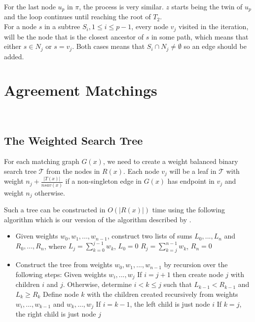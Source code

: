 For the last node $u_p$ in $\pi$, the process is very similar. $z$ starts being the twin of $u_p$ and the loop continues until reaching the root of $T_2$.\\

For a node $s$ in a subtree $S_i, 1 \le i \le p-1$, every node $v_j$ visited in the iteration, will be the node that is the closest ancestor of $s$ in some path, which means that either $s \in N_j$ or $s=v_j$. Both cases means that $S_i \cap N_j \ne \emptyset$ so an edge should be added.

\section{Agreement Matchings}
\\

\subsection{The Weighted Search Tree}
For each matching graph $G(x)$, we need to create a weight balanced binary search tree $\mathcal{T}$ from the nodes in $R(x)$. Each node $v_j$ will be a leaf in $\mathcal{T}$ with weight $n_j + \frac{|T(x)|}{nsav(x)}$ if a non-singleton edge in $G(x)$ has endpoint in $v_j$ and weight $n_j$ otherwise.

Such a tree can be constructed in $O(|R(x)|)$ time using the following algorithm which is our version of the algorithm described by .

\begin{itemize}
	\item Given weights ${w_0, w_1, ..., w_{n-1}}$, construct two lists of sums ${L_0, ..., L_{n}}$ and ${R_0, ..., R_{n}}$, where
	\subitem $L_j=\sum_{k=0}^{j-1} w_k$, $L_0=0$
	\subitem $R_j=\sum_{k=j}^{n-1} w_k$, $R_{n}=0$
	\item Construct the tree from weights ${w_0, w_1, ..., w_{n-1}}$ by recursion over the following steps:
	\subitem Given weights ${w_i, ..., w_j}$
	\subitem If $i=j+1$ then create node $j$ with children $i$ and $j$.
	\subitem Otherwise, determine $i<k\le j$ such that
	\subsubitem $L_{k-1} < R_{k-1}$ and $L_k \ge R_k$
	\subitem Define node $k$ with the children created recursively from weights
	\subsubitem ${w_i, ..., w_{k-1}}$ and ${w_k, ..., w_j}$
	\subsubitem If $i=k-1$, the left child is just node $i$
	\subsubitem If $k=j$, the right child is just node $j$
\end{itemize}

